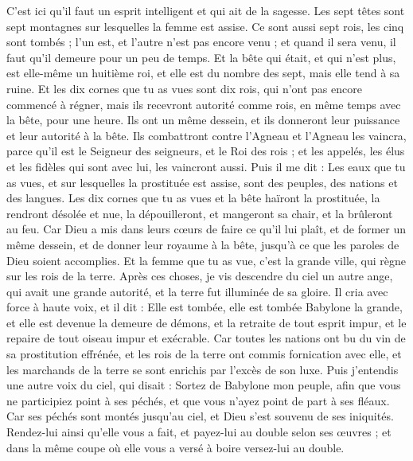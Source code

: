 \begin{multicols}{2}
C'est ici qu'il faut un esprit intelligent et qui ait de la sagesse. Les sept têtes sont sept montagnes sur lesquelles la femme est assise.
Ce sont aussi sept rois, les cinq sont tombés ; l'un est, et l'autre n'est pas encore venu ; et quand il sera venu, il faut qu'il demeure pour un peu de temps.
Et la bête qui était, et qui n'est plus, est elle-même un huitième roi, et elle est du nombre des sept, mais elle tend à sa ruine.
Et les dix cornes que tu as vues sont dix rois, qui n'ont pas encore commencé à régner, mais ils recevront autorité comme rois, en même temps avec la bête, pour une heure.
Ils ont un même dessein, et ils donneront leur puissance et leur autorité à la bête.
Ils combattront contre l'Agneau et l'Agneau les vaincra, parce qu'il est le Seigneur des seigneurs, et le Roi des rois ; et les appelés, les élus et les fidèles qui sont avec lui, les vaincront aussi.
Puis il me dit : Les eaux que tu as vues, et sur lesquelles la prostituée est assise, sont des peuples, des nations et des langues.
Les dix cornes que tu as vues et la bête haïront la prostituée, la rendront désolée et nue, la dépouilleront, et mangeront sa chair, et la brûleront au feu.
Car Dieu a mis dans leurs cœurs de faire ce qu'il lui plaît, et de former un même dessein, et de donner leur royaume à la bête, jusqu'à ce que les paroles de Dieu soient accomplies.
Et la femme que tu as vue, c'est la grande ville, qui règne sur les rois de la terre.
\VerseOne{}Après ces choses, je vis descendre du ciel un autre ange, qui avait une grande autorité, et la terre fut illuminée de sa gloire.
Il cria avec force à haute voix, et il dit : Elle est tombée, elle est tombée Babylone la grande, et elle est devenue la demeure de démons, et la retraite de tout esprit impur, et le repaire de tout oiseau impur et exécrable.
Car toutes les nations ont bu du vin de sa prostitution effrénée, et les rois de la terre ont commis fornication avec elle, et les marchands de la terre se sont enrichis par l'excès de son luxe.
Puis j'entendis une autre voix du ciel, qui disait : Sortez de Babylone mon peuple, afin que vous ne participiez point à ses péchés, et que vous n'ayez point de part à ses fléaux.
Car ses péchés sont montés jusqu'au ciel, et Dieu s'est souvenu de ses iniquités.
Rendez-lui ainsi qu'elle vous a fait, et payez-lui au double selon ses œuvres ; et dans la même coupe où elle vous a versé à boire versez-lui au double.

\end{multicols}
